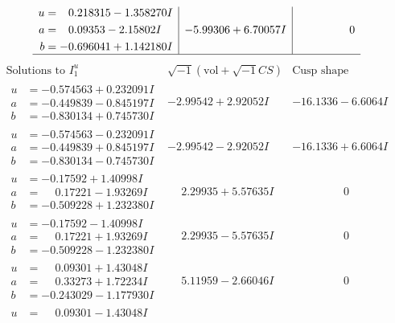 \documentclass[1p]{elsarticle_modified}
\theoremstyle{definition}
\newcommand{\I}{\sqrt{-1}}
\begin{document}
$$\begin{array}{c|c|c}
\begin{aligned}
u &= \phantom{-}0.218315 - 1.358270 I \\
a &= \phantom{-}0.09353 - 2.15802 I \\
b &= -0.696041 + 1.142180 I\end{aligned}
 & -5.99306 + 6.70057 I & \phantom{-0.000000 } 0\\
 \hline 
 \end{array}$$\newpage$$\begin{array}{c|c|c}  
\text{Solutions to }I^u_{1}& \I (\text{vol} + \sqrt{-1}CS) & \text{Cusp shape}\\
 \hline 
\begin{aligned}
u &= -0.574563 + 0.232091 I \\
a &= -0.449839 - 0.845197 I \\
b &= -0.830134 + 0.745730 I\end{aligned}
 & -2.99542 + 2.92052 I & -16.1336 - 6.6064 I \\ \hline\begin{aligned}
u &= -0.574563 - 0.232091 I \\
a &= -0.449839 + 0.845197 I \\
b &= -0.830134 - 0.745730 I\end{aligned}
 & -2.99542 - 2.92052 I & -16.1336 + 6.6064 I \\ \hline\begin{aligned}
u &= -0.17592 + 1.40998 I \\
a &= \phantom{-}0.17221 - 1.93269 I \\
b &= -0.509228 + 1.232380 I\end{aligned}
 & \phantom{-}2.29935 + 5.57635 I & \phantom{-0.000000 } 0 \\ \hline\begin{aligned}
u &= -0.17592 - 1.40998 I \\
a &= \phantom{-}0.17221 + 1.93269 I \\
b &= -0.509228 - 1.232380 I\end{aligned}
 & \phantom{-}2.29935 - 5.57635 I & \phantom{-0.000000 } 0 \\ \hline\begin{aligned}
u &= \phantom{-}0.09301 + 1.43048 I \\
a &= \phantom{-}0.33273 + 1.72234 I \\
b &= -0.243029 - 1.177930 I\end{aligned}
 & \phantom{-}5.11959 - 2.66046 I & \phantom{-0.000000 } 0 \\ \hline\begin{aligned}
u &= \phantom{-}0.09301 - 1.43048 I \\

\end{aligned}
\end{array}$$
\end{document}
